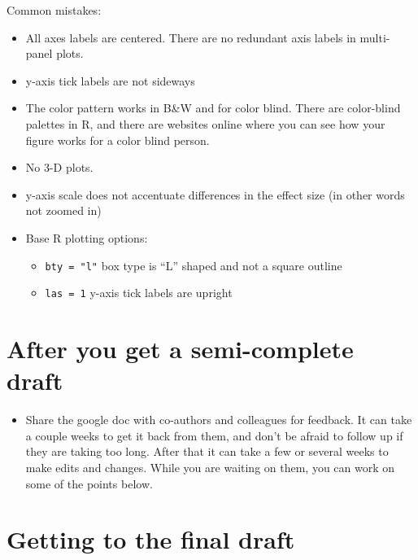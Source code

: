 \documentclass[
  letterpaper,
  DIV=11,
  numbers=noendperiod]{scrreprt}
\providecommand{\tightlist}{%
  \setlength{\itemsep}{0pt}\setlength{\parskip}{0pt}}\usepackage{longtable,booktabs,array}
\begin{document}
Common mistakes:

\begin{itemize}
\item
  All axes labels are centered. There are no redundant axis labels in
  multi-panel plots.
\item
  y-axis tick labels are not sideways
\item
  The color pattern works in B\&W and for color blind. There are
  color-blind palettes in R, and there are websites online where you can
  see how your figure works for a color blind person.
\item
  No 3-D plots.
\item
  y-axis scale does not accentuate differences in the effect size (in
  other words not zoomed in)
\item
  Base R plotting options:

  \begin{itemize}
  \item
    \texttt{bty\ =\ "l"} box type is ``L'' shaped and not a square
    outline
  \item
    \texttt{las\ =\ 1} y-axis tick labels are upright
  \end{itemize}
\end{itemize}

\hypertarget{after-you-get-a-semi-complete-draft}{%
\section*{\texorpdfstring{\textbf{After you get a semi-complete
draft}}{After you get a semi-complete draft}}\label{after-you-get-a-semi-complete-draft}}


\begin{itemize}
\tightlist
\item
  Share the google doc with co-authors and colleagues for feedback. It
  can take a couple weeks to get it back from them, and don't be afraid
  to follow up if they are taking too long. After that it can take a few
  or several weeks to make edits and changes. While you are waiting on
  them, you can work on some of the points below.
\end{itemize}

\hypertarget{getting-to-the-final-draft}{%
\section*{\texorpdfstring{\textbf{Getting to the final
draft}}{Getting to the final draft}}\label{getting-to-the-final-draft}}
\end{document}
